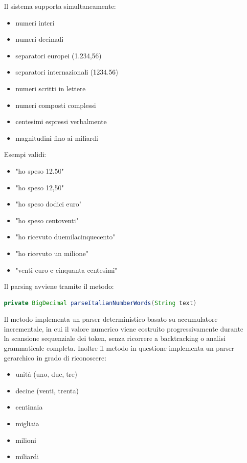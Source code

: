 Il sistema supporta simultaneamente:

\begin{itemize}
    \item numeri interi
    \item numeri decimali
    \item separatori europei (1.234,56)
    \item separatori internazionali (1234.56)
    \item numeri scritti in lettere
    \item numeri composti complessi
    \item centesimi espressi verbalmente
    \item magnitudini fino ai miliardi
\end{itemize}

Esempi validi:

\begin{itemize}
    \item "ho speso 12.50"
    \item "ho speso 12,50"
    \item "ho speso dodici euro"
    \item "ho speso centoventi"
    \item "ho ricevuto duemilacinquecento"
    \item "ho ricevuto un milione"
    \item "venti euro e cinquanta centesimi"
\end{itemize}

Il parsing avviene tramite il metodo:

\bigskip

\begin{lstlisting}[language=Java]
private BigDecimal parseItalianNumberWords(String text)
\end{lstlisting}

Il metodo implementa un parser deterministico basato su accumulatore incrementale, in cui il valore numerico viene costruito progressivamente durante la scansione sequenziale dei token, senza ricorrere a backtracking o analisi grammaticale completa. Inoltre il metodo in questione implementa un parser gerarchico in grado di riconoscere:

\begin{itemize}
    \item unità (uno, due, tre)
    \item decine (venti, trenta)
    \item centinaia
    \item migliaia
    \item milioni
    \item miliardi
\end{itemize}

